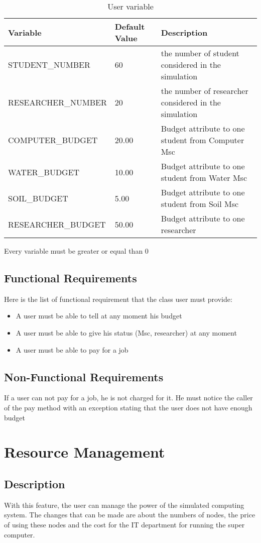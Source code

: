 \documentclass{scrreprt}
\begin{document}
\begin{table}[ht]
\centering
\caption{User variable}
\begin {tabular}{ l l l}
\toprule
Variable & Default Value & Description \\
\midrule
\midrule
 STUDENT_NUMBER & 60  & the number of student considered in the simulation \\
 RESEARCHER_NUMBER & 20 & the number of researcher considered in the simulation \\
 COMPUTER_BUDGET & 20.00  & Budget attribute to one student from Computer Msc \\
 WATER_BUDGET & 10.00  & Budget attribute to one student from Water Msc \\
 SOIL_BUDGET & 5.00  & Budget attribute to one student from Soil Msc \\
 RESEARCHER_BUDGET & 50.00  & Budget attribute to one researcher \\
\bottomrule
\end {tabular}
\end{table}
Every variable must be greater or equal than 0

\subsection{Functional Requirements}
Here is the list of functional requirement that the class user must provide:\begin{itemize}
    \item A user must be able to tell at any moment his budget
    \item A user must be able to give his status (Msc, researcher) at any moment
    \item A user must be able to pay for a job
\end{itemize}
\subsection{Non-Functional Requirements}
If a user can not pay for a job, he is not charged for it. He must notice the caller of the pay method with an exception stating that the user does not have enough budget

\section{Resource Management}


\subsection{Description}
With this feature, the user can manage the power of the simulated computing system. The changes that can be made are about the numbers of nodes, the price of using these nodes and the cost for the IT department for running the super computer. 
\end{document}
